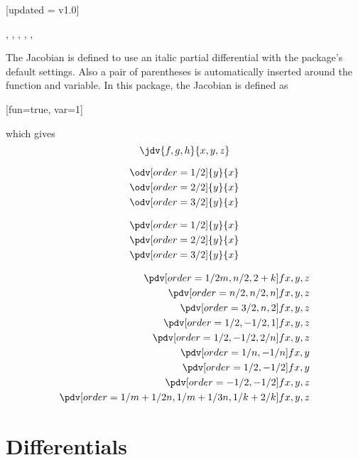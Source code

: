 	\begin{function}{\jdv}[updated = v1.0]
		\begin{syntax}
			\sarg, , , \targ{/}, , 
		\end{syntax}
		The Jacobian is defined to use an italic partial differential with the package's default settings. Also a pair of parentheses is automatically inserted around the function and variable. In this package, the Jacobian is defined as
			
		\begin{definition}
			\DeclareDerivative{\jdv}{\partial}[fun=true, var=1]
		\end{definition}
		
		\noindent which gives
		\begin{equation*}
			\jdv{f,g,h}{x,y,z}
		\end{equation*}
	\end{function}
	
	\begin{align}
		\odv[order=1/2]{y}{x} \\
		\odv[order=2/2]{y}{x} \\
		\odv[order=3/2]{y}{x}
	\end{align}
	
	\begin{align}
		\pdv[order=1/2]{y}{x} \\
		\pdv[order=2/2]{y}{x} \\
		\pdv[order=3/2]{y}{x}
	\end{align}
	
	\begin{align}
		\pdv[order={1/2m,n/2,2+k}]{f}{x,y,z} \\
		\pdv[order={n/2,n/2,n}]{f}{x,y,z} \\
		\pdv[order={3/2,n,2}]{f}{x,y,z} \\
		\pdv[order={1/2,-1/2,1}]{f}{x,y,z} \\
		\pdv[order={1/2,-1/2,2/n}]{f}{x,y,z} \\
		\pdv[order={1/n,-1/n}]{f}{x,y} \\
		\pdv[order={1/2,-1/2}]{f}{x,y} \\
		\pdv[order={-1/2,-1/2}]{f}{x,y,z} \\
		\pdv[order={1/m+1/2n,1/m+1/3n,1/k+2/k}]{f}{x,y,z} \\
	\end{align}
	
		
		\clearpage
		\section{Differentials}
	
